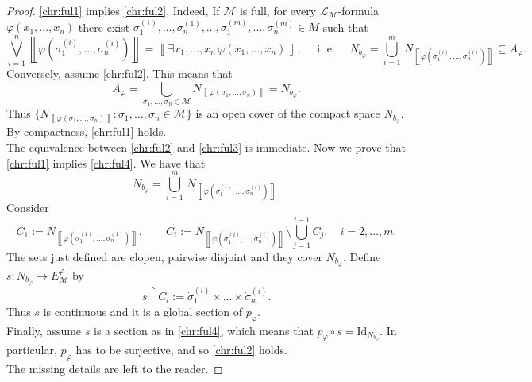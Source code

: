 \documentclass[11pt]{amsart}
\newcommand{\nphi}{\varphi}
\newcommand{\LL}{\mathcal{L}}
\newcommand{\Id}{\textrm{Id}}
\theoremstyle{plain}
\theoremstyle{definition}
\theoremstyle{plain}
\theoremstyle{remark}
\newcommand{\M}{\mathcal{M}}
\newcommand{\cp}[1]{\left( #1 \right)}
\newcommand{\Qp}[1]{\left\llbracket #1 \right\rrbracket}
\newcommand{\bp}[1]{\left\lbrace #1 \right\rbrace}
\newcommand{\0}{\mathsf{0}}
\renewcommand{\1}{\mathsf{1}}
\renewcommand{\2}{\mathsf{2}}
\theoremstyle{definition}
\begin{document}
\begin{proof}
\ref{chr:ful1} implies \ref{chr:ful2}. Indeed, If $\M$ is full, for every $\LL_\M$-formula $\nphi(x_1, \dots, x_n)$ there exist $\sigma_1^{(1)}, \dots, \sigma_n^{(1)}, \dots, \sigma_1^{(m)}, \dots, \sigma_n^{(m)}\in M$ such that
\[
\bigvee_{i=1}^n\Qp{\nphi(\sigma_1^{(i)}, \dots, \sigma_n^{(i)})}=
\Qp{\exists x_1, \dots, x_n\,\nphi(x_1, \dots, x_n)},\quad\text{ i. e. }\quad N_{b_\nphi}=\bigcup_{i=1}^m\,N_{\Qp{\nphi(\sigma_1^{(i)}, \dots, \sigma_n^{(i)})}}\subseteq A_\nphi.
\]
Conversely, assume \ref{chr:ful2}. This means that
\[
A_\nphi=\bigcup_{\sigma_1, \dots, \sigma_n\in\M}N_{\Qp{\nphi(\sigma_1, \dots, \sigma_n)}}=N_{b_\nphi}.
\]
Thus $\{N_{\Qp{\nphi(\sigma_1, \dots, \sigma_n)}}:\sigma_1, \dots, \sigma_n\in\M\}$ is an open cover of the compact space $N_{b_\nphi}$. By compactness, \ref{chr:ful1} holds.\\
The equivalence between \ref{chr:ful2} and \ref{chr:ful3} is immediate. Now we prove that \ref{chr:ful1} implies \ref{chr:ful4}. We have that
\[
N_{b_\nphi}=\bigcup_{i=1}^m\,N_{\Qp{\nphi(\sigma_1^{(i)}, \dots, \sigma_n^{(i)})}}.
\]
Consider
\[
C_1:=N_{\Qp{\nphi(\sigma_1^{(1)}, \dots, \sigma_n^{(1)})}},\qquad C_i:=N_{\Qp{\nphi(\sigma_1^{(i)}, \dots, \sigma_n^{(i)})}}\setminus\bigcup_{j=1}^{i-1}C_j, \quad i=2, \dots, m.
\]
The sets just defined are clopen, pairwise disjoint and they cover $N_{b_\nphi}$. Define $s:N_{b_\nphi}\to E^\nphi_\M$ by
\[s\restriction C_i:=\dot{\sigma}^{(i)}_1\times\dots\times\dot{\sigma}^{(i)}_n.
\]
Thus $s$ is continuous and it is a global section of $p_\nphi$.\\
Finally, assume $s$ is a section as in \ref{chr:ful4}, which means that $p_\nphi\circ s=\Id_{N_{b_\nphi}}$. In particular, $p_\nphi$ has to be surjective, and so \ref{chr:ful2} holds.\\
The missing details are left to the reader.
\end{proof}
\end{document}
